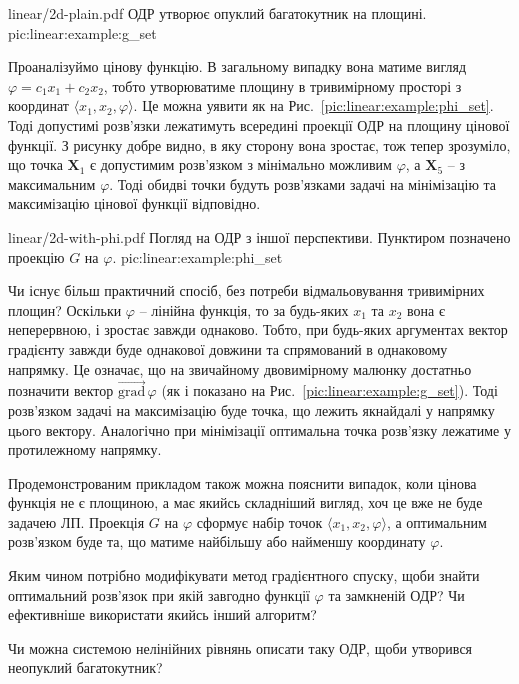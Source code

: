 \documentclass[\main/book.tex]{subfiles}
\begin{document}
\illustration
 {linear/2d-plain.pdf}
 {ОДР утворює опуклий багатокутник на площині.}
 {pic:linear:example:g_set}

Проаналізуймо цінову функцію. В загальному випадку вона матиме вигляд $\varphi = c_1 x_1 + c_2 x_2$, тобто утворюватиме площину в тривимірному просторі з координат $\langle x_1, x_2, \varphi \rangle$. Це можна уявити як на Рис.~\ref{pic:linear:example:phi_set}. Тоді допустимі розв'язки лежатимуть всередині проекції ОДР на площину цінової функції. З рисунку добре видно, в яку сторону вона зростає, тож тепер зрозуміло, що точка $\mathbf{X}_1$ є допустимим розв'язком з мінімально можливим $\varphi$, а $\mathbf{X}_5$ -- з максимальним $\varphi$. Тоді обидві точки будуть розв'язками задачі на мінімізацію та максимізацію цінової функції відповідно.

\illustration
 {linear/2d-with-phi.pdf}
 {Погляд на ОДР з іншої перспективи. Пунктиром позначено проекцію $G$ на $\varphi$.}
 {pic:linear:example:phi_set}

Чи існує більш практичний спосіб, без потреби відмальовування тривимірних площин? Оскільки $\varphi$ -- лінійна функція, то за будь-яких $x_1$ та $x_2$ вона є неперервною, і зростає завжди однаково. Тобто, при будь-яких аргументах вектор градієнту завжди буде однакової довжини та спрямований в однаковому напрямку. Це означає, що на звичайному двовимірному малюнку достатньо позначити вектор $\overrightarrow{\mathrm{grad}}\,\varphi$ (як і показано на Рис.~\ref{pic:linear:example:g_set}). Тоді розв'язком задачі на максимізацію буде точка, що лежить якнайдалі у напрямку цього вектору. Аналогічно при мінімізації оптимальна точка розв'язку лежатиме у протилежному напрямку.

\begin{note}
 Продемонстрованим прикладом також можна пояснити випадок, коли цінова функція не є площиною, а має якийсь складніший вигляд, хоч це вже не буде задачею ЛП. Проекція $G$ на $\varphi$ сформує набір точок $\langle x_1, x_2, \varphi \rangle$, а оптимальним розв'язком буде та, що матиме найбільшу або найменшу координату $\varphi$.
\end{note}

\begin{question}
 Яким чином потрібно модифікувати метод градієнтного спуску, щоби знайти оптимальний розв'язок при якій завгодно функції $\varphi$ та замкненій ОДР? Чи ефективніше використати якийсь інший алгоритм?
\end{question}

\begin{question}
 Чи можна системою нелінійних рівнянь описати таку ОДР, щоби утворився неопуклий багатокутник?
\end{question}
\end{document}
